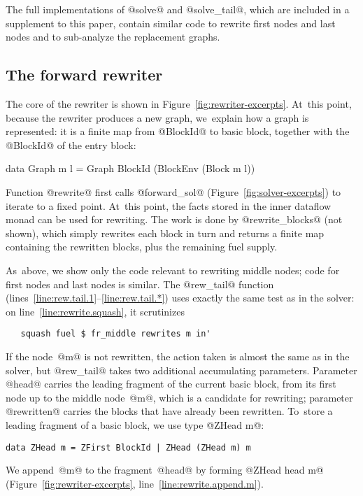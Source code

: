 \documentclass[blockstyle,preprint,natbib,nocopyrightspace]{sigplanconf}
\newcommand\lineref[1]{line~\ref{line:#1}}
\newcommand\linerangeref[2]{\mbox{lines~\ref{line:#1}--\ref{line:#2}}}
\newcommand\seclabel[1]{\label{sec:#1}}
\newcommand\figref[1]{Figure~\ref{fig:#1}}
\begin{document}
The full implementations of @solve@ and @solve_tail@, which are
included in a supplement to this paper, contain similar code to
rewrite first nodes and last nodes and to sub-analyze the replacement
graphs. 





\subsection{The forward rewriter}

\seclabel{forward-rewriter}

The core of the rewriter is shown in \figref{rewriter-excerpts}.
At~this point, because the rewriter produces a new graph, we~explain
how a graph is represented: it is a finite map from  @BlockId@
  to basic block, together with the @BlockId@ of the entry block:
\begin{code}
data Graph m l = Graph BlockId (BlockEnv (Block m l))
\end{code}
Function @rewrite@ first calls @forward_sol@
(\figref{solver-excerpts}) to iterate to a fixed point.
At~this point, the facts stored in the inner dataflow monad can be
used for rewriting.
The work is done by @rewrite_blocks@ (not shown), which simply
rewrites each block in turn and returns a finite map containing the
rewritten blocks, plus the remaining fuel supply.

As~above, we show only the code relevant to rewriting middle nodes;
code for first nodes and last nodes is similar.
The @rew_tail@ function (\linerangeref{rew.tail.1}{rew.tail.*}) uses
exactly the same test as in the solver: on \lineref{rewrite.squash},
it scrutinizes
\begin{verbatim}
   squash fuel $ fr_middle rewrites m in'
\end{verbatim}
If the node~@m@ is not rewritten, the action taken is almost the same
as in the solver, but @rew_tail@ takes two 
 additional accumulating parameters.
Parameter @head@ carries
the leading fragment of the current basic block,
from its first node up to the middle node~@m@, which is
a candidate for rewriting;
parameter @rewritten@ carries the blocks that have already been
rewritten.
%
To~store a leading fragment of a basic block, we use type @ZHead m@:
\begin{verbatim} 
data ZHead m = ZFirst BlockId | ZHead (ZHead m) m
\end{verbatim}
We append~@m@ to the
fragment~@head@ by forming @ZHead head m@ 
(\figref{rewriter-excerpts}, \lineref{rewrite.append.m}). 
\end{document}

